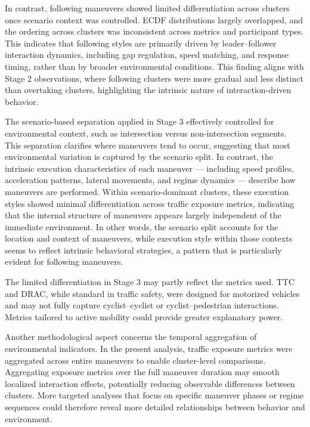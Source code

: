 In contrast, following maneuvers showed limited differentiation across clusters once scenario context was controlled. ECDF distributions largely overlapped, and the ordering across clusters was inconsistent across metrics and participant types. This indicates that following styles are primarily driven by leader–follower interaction dynamics, including gap regulation, speed matching, and response timing, rather than by broader environmental conditions. This finding aligns with Stage 2 observations, where following clusters were more gradual and less distinct than overtaking clusters, highlighting the intrinsic nature of interaction-driven behavior.

The scenario-based separation applied in Stage 3 effectively controlled for environmental context, such as intersection versus non-intersection segments. This separation clarifies where maneuvers tend to occur, suggesting that most environmental variation is captured by the scenario split. In contrast, the intrinsic execution characteristics of each maneuver — including speed profiles, acceleration patterns, lateral movements, and regime dynamics — describe how maneuvers are performed. Within scenario-dominant clusters, these execution styles showed minimal differentiation across traffic exposure metrics, indicating that the internal structure of maneuvers appears largely independent of the immediate environment. In other words, the scenario split accounts for the location and context of maneuvers, while execution style within those contexts seems to reflect intrinsic behavioral strategies, a pattern that is particularly evident for following maneuvers.

The limited differentiation in Stage 3 may partly reflect the metrics used. TTC and DRAC, while standard in traffic safety, were designed for motorized vehicles and may not fully capture cyclist–cyclist or cyclist–pedestrian interactions. Metrics tailored to active mobility could provide greater explanatory power.

Another methodological aspect concerns the temporal aggregation of environmental indicators. In the present analysis, traffic exposure metrics were aggregated across entire maneuvers to enable cluster-level comparisons. Aggregating exposure metrics over the full maneuver duration may smooth localized interaction effects, potentially reducing observable differences between clusters. More targeted analyses that focus on specific maneuver phases or regime sequences could therefore reveal more detailed relationships between behavior and environment.


